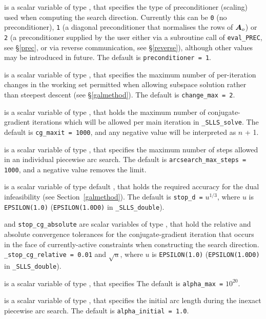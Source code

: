 \documentclass{galahad}
\newcommand{\packagename}{SLLS}
\newcommand{\fullpackagename}{\libraryname\_\packagename}
\newcommand{\solver}{{\tt \fullpackagename\_solve}}
\begin{document}
\begin{description}
 is a scalar variable of type \integer, that
specifies the type of preconditioner (scaling) used when computing the
search direction. Currently this can be 
{\tt 0} (no preconditioner), 
{\tt 1} (a diagonal preconditioner that normalises the rows of ${\bm{A}}_o$) or
{\tt 2} (a preconditioner supplied by the user either via a subroutine
call of {\tt eval\_PREC}, see \S\ref{prec}, or via reverse communication, 
see \S\ref{reverse}),
although other values may be introduced
in future. The default is {\tt preconditioner = 1}.

 is a scalar variable of type \integer, that
specifies the maximum number of per-iteration changes in the working set
permitted when allowing subspace solution rather than steepest descent
(see \S\ref{galmethod}).
The default is {\tt change\_max = 2}.

 is a scalar variable of type \integer, that holds the
maximum number of conjugate-gradient iterations which will be allowed
per main iteration in \solver.
The default is {\tt cg\_maxit = 1000}, and any negative value will
be interpreted as $n$ + 1.

 is a scalar variable of type \integer,
that specifies the maximum number of steps allowed in an individual
piecewise arc search.
The default is {\tt arcsearch\_max\_steps = 1000}, and a negative value
removes the limit.

 is a scalar variable of type default
\realdp, that holds the
required accuracy for the dual infeasibility (see Section~\ref{galmethod}).
The default is {\tt stop\_d =} $u^{1/3}$,
where $u$ is {\tt EPSILON(1.0)} ({\tt EPSILON(1.0D0)} in
{\tt \fullpackagename\_double}).

 and {\tt stop\_cg\_absolute}
are scalar variables of type \realdp,
that hold the relative and absolute convergence tolerances for the
conjugate-gradient iteration that occurs in the face of currently-active
constraints when constructing the search direction.
{\tt \_stop\_cg\_relative = 0.01}
and  $\sqrt{u}$,
where $u$ is {\tt EPSILON(1.0)} ({\tt EPSILON(1.0D0)} in
{\tt \fullpackagename\_double}).

 is a scalar variable of type \realdp, that specifies
The default is {\tt alpha\_max =} $10^{20}$.

 is a scalar variable of type \realdp, that
specifies the initial arc length during the inexact piecewise arc search.
The default is {\tt alpha\_initial = 1.0}.


\end{description}
\end{document}
